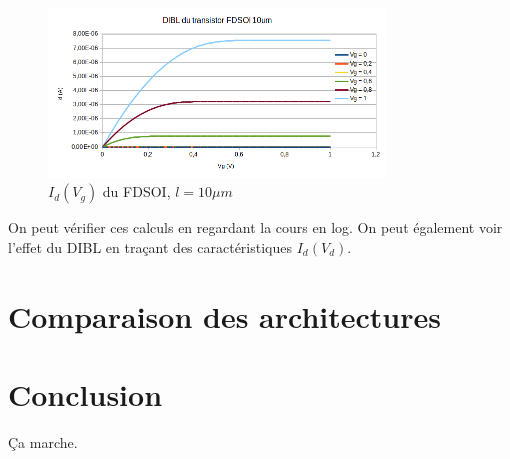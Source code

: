 \documentclass[a4paper,11pt]{report}
\begin{document}
\begin{figure}[h]
    \begin{center}
        \includegraphics[width=0.8\textwidth]{Images/DIBL-1-10}
        \caption{$I_d(V_g)$ du FDSOI, $l =10\mu m$}
        \label{transc_fdsoi_30nm}
    \end{center}
\end{figure}
On peut vérifier ces calculs en regardant la cours en log.
On peut également voir l'effet du DIBL en traçant des caractéristiques $I_d(V_d)$.

\chapter{Comparaison des architectures}

\chapter*{Conclusion}

Ça marche. %
\end{document}
